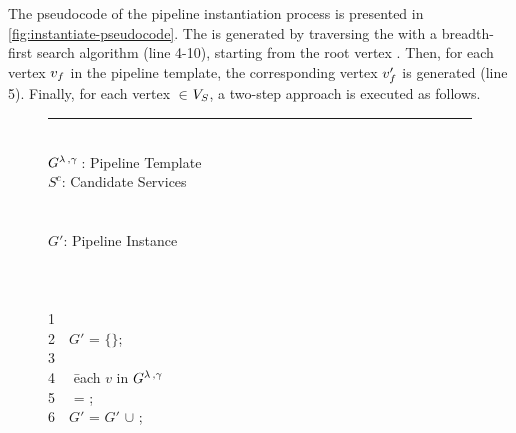 {\color{OurColor}The pseudocode of the pipeline instantiation process is presented in \cref{fig:instantiate-pseudocode}.} The \pipelineInstance  is generated by traversing the \pipelineTemplate with a breadth-first search algorithm {\color{OurColor}(line 4-10)}, starting from the root vertex .
Then, for each vertex $v_{f}$ in the pipeline template, the corresponding vertex $v'_{f}$ is generated {\color{OurColor}(line 5)}.
Finally, for each vertex $\in$$V_S$, a two-step approach is executed as follows.

\newenvironment{redtext}{\footnotesize	\color{gray}}{~~}
\newenvironment{ourcolor}{\color{OurColor}}{~~}
\begin{figure}[!t]

  \hrule\vspace{3pt}
  \begin{ourcolor}
  \begin{tabbing}
      \INPUT\\
      $G^{\lambda\,,\gamma\,}$: Pipeline Template\\
      $S^c$: Candidate Services\\
      ~\\[1pt]
      \OUTPUT\\
      $G'$: Pipeline Instance\\
      ~\\[1pt]
      \\
      \\
      \begin{redtext}1\end{redtext}\\
      \begin{redtext}2\end{redtext}$G'$ = $\{\}$;\\
      \begin{redtext}3\end{redtext}\\
      \begin{redtext}4\end{redtext} \= each $v$ in $G^{\lambda\,,\gamma\,}$\\
      \begin{redtext}5\end{redtext}\tabone \vii{} = ;\\
      \begin{redtext}6\end{redtext}\tabone $G'$ = $G'$ $\cup$ \vii;\\

\end{tabbing}
\end{ourcolor}
\end{figure}
